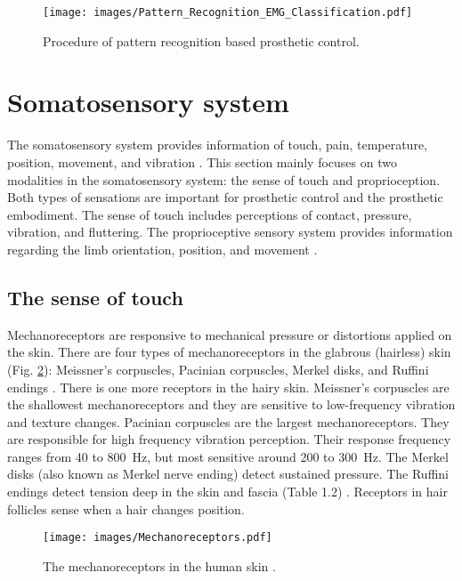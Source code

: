  \begin{figure}[ht!]
    \centering
        \texttt{[image: images/Pattern\_Recognition\_EMG\_Classification.pdf]}
        \caption{Procedure of pattern recognition based prosthetic control.}
        \label{fig:pattern_recognition_emg_classification}
\end{figure}



\section{Somatosensory system}
The somatosensory system provides information of  touch, pain, temperature, position, movement, and vibration \cite{hendry_chapter_2013}.
This section mainly focuses on two modalities in the somatosensory system: the sense of touch and proprioception. Both types of sensations are important for prosthetic control and the prosthetic embodiment.
The sense of touch includes perceptions of contact, pressure, vibration, and fluttering.
The proprioceptive sensory system provides information regarding the limb orientation, position, and movement \cite{grey2010proprioceptive}. 

\subsection{The sense of touch}
Mechanoreceptors are responsive to mechanical pressure or distortions applied on the skin.  There are four types of mechanoreceptors in the glabrous (hairless) skin (Fig. \ref{fig:mechanoreceptor}): Meissner’s corpuscles, Pacinian corpuscles,  Merkel disks, and Ruffini endings \cite{burgesscutaneous1973}. There is one more receptors in the hairy skin.  
Meissner’s corpuscles are the shallowest mechanoreceptors and they are sensitive to low-frequency vibration and texture changes.  
Pacinian corpuscles are the largest mechanoreceptors. They are responsible for high frequency vibration perception. Their response frequency ranges from 40 to \SI{800}{Hz}, but most sensitive around 200 to \SI{300}{Hz}. The Merkel disks (also known as Merkel nerve ending) detect sustained pressure. The Ruffini endings detect tension deep in the skin and fascia (Table 1.2) \cite{reed_tactile_2002}.
Receptors in hair follicles sense when a hair changes position.

 \begin{figure}[htb!]
    \centering
        \texttt{[image: images/Mechanoreceptors.pdf]}
        \caption{The mechanoreceptors in the human skin \cite{johnson2001roles}.}
        \label{fig:mechanoreceptor}
\end{figure}



